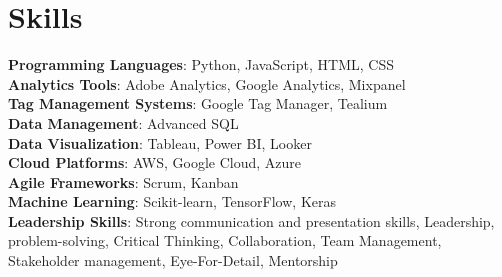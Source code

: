 \section{Skills}
  \begin{itemize}[leftmargin=0.1in, label={}]
    \normalsize{\item{
      \textbf{Programming Languages}: Python, JavaScript, HTML, CSS \\
      \textbf{Analytics Tools}: Adobe Analytics, Google Analytics, Mixpanel \\
      \textbf{Tag Management Systems}: Google Tag Manager, Tealium \\
      \textbf{Data Management}: Advanced SQL \\
      \textbf{Data Visualization}: Tableau, Power BI, Looker \\
      \textbf{Cloud Platforms}: AWS, Google Cloud, Azure \\
      \textbf{Agile Frameworks}: Scrum, Kanban \\
      \textbf{Machine Learning}: Scikit-learn, TensorFlow, Keras \\
      \textbf{Leadership Skills}: Strong communication and presentation skills, Leadership, problem-solving, Critical Thinking, Collaboration, Team Management, Stakeholder management, Eye-For-Detail, Mentorship \\
     }}
  \end{itemize}
